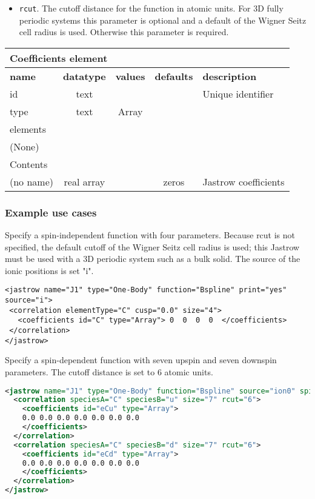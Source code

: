  \begin{itemize}
 \item \texttt{rcut}. The cutoff distance for the function in atomic units. For 3D fully periodic systems this parameter is optional and a default of the Wigner Seitz cell radius is used. Otherwise this parameter is required.
 \end{itemize}

\begin{table}[h]
\begin{center}
\begin{tabular}{l c c c l }
\hline
\multicolumn{5}{l}{Coefficients element} \\
\hline
\bfseries name & \bfseries datatype & \bfseries values & \bfseries defaults & \bfseries description \\
\hline
id & text & & & Unique identifier \\
type & text & Array & & \\
\hline
\multicolumn{5}{l}{elements}\\ \hline
(None) & & & \\ \hline
\multicolumn{5}{l}{Contents}\\ \hline
 (no name) & real array & & zeros & Jastrow coefficients \\ \hline
\end{tabular}
\end{center}
\end{table}


\subsubsection{Example use cases}
\label{sec:1bjsplineexamples}

Specify a spin-independent function with four parameters. Because rcut  is not specified, the default cutoff of the Wigner Seitz cell radius is used; this Jastrow must be used with a 3D periodic system such as a bulk solid. The source of the ionic positions is set "i".
\begin{lstlisting}
<jastrow name="J1" type="One-Body" function="Bspline" print="yes" source="i">
 <correlation elementType="C" cusp="0.0" size="4">
   <coefficients id="C" type="Array"> 0  0  0  0  </coefficients>
 </correlation>
</jastrow>
\end{lstlisting}

Specify a spin-dependent function with seven upspin and seven downspin parameters. The cutoff distance is set to 6 atomic units.
\begin{lstlisting}[language=xml]
<jastrow name="J1" type="One-Body" function="Bspline" source="ion0" spin="yes">
  <correlation speciesA="C" speciesB="u" size="7" rcut="6">
    <coefficients id="eCu" type="Array"> 
    0.0 0.0 0.0 0.0 0.0 0.0 0.0
    </coefficients>
  </correlation>
  <correlation speciesA="C" speciesB="d" size="7" rcut="6">
    <coefficients id="eCd" type="Array"> 
    0.0 0.0 0.0 0.0 0.0 0.0 0.0
    </coefficients>
  </correlation>
</jastrow>
\end{lstlisting}

